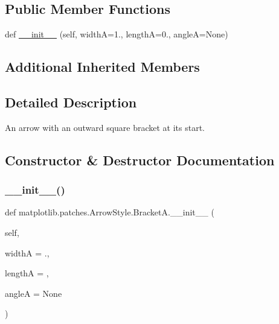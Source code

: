 \subsection*{Public Member Functions}
\begin{DoxyCompactItemize}
\item 
def \hyperlink{classmatplotlib_1_1patches_1_1ArrowStyle_1_1BracketA_a884236d0478515c2a52f9836a97796cf}{\+\_\+\+\_\+init\+\_\+\+\_\+} (self, widthA=1., lengthA=0., angleA=None)
\end{DoxyCompactItemize}
\subsection*{Additional Inherited Members}


\subsection{Detailed Description}
\begin{DoxyVerb}An arrow with an outward square bracket at its start.\end{DoxyVerb}
 

\subsection{Constructor \& Destructor Documentation}
\mbox{\label{classmatplotlib_1_1patches_1_1ArrowStyle_1_1BracketA_a884236d0478515c2a52f9836a97796cf}} 
\subsubsection{\texorpdfstring{\+\_\+\+\_\+init\+\_\+\+\_\+()}{\_\_init\_\_()}}
{\footnotesize\ttfamily def matplotlib.\+patches.\+Arrow\+Style.\+Bracket\+A.\+\_\+\+\_\+init\+\_\+\+\_\+ (\begin{DoxyParamCaption}\item[{}]{self,  }\item[{}]{widthA = {.},  }\item[{}]{lengthA = {},  }\item[{}]{angleA = {\ttfamily None} }\end{DoxyParamCaption})}

